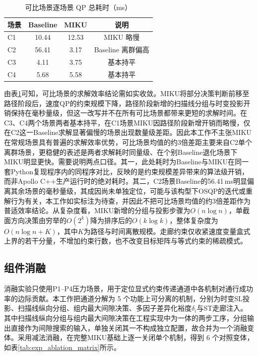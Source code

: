 \documentclass[a4paper,11pt]{ctexart}
\theoremstyle{definition}
\begin{document}
\begin{table}[htbp]
\centering
\caption{可比场景逐场景 QP 总耗时（ms）}
\label{tab:exp_qp_percomp}
\small
\begin{tabular}{lccc}
\toprule
\textbf{场景} & \textbf{Baseline} & \textbf{MIKU} & \textbf{说明} \\
\midrule
C1 & 10.44 & 12.53 & MIKU 略慢 \\
C2 & 56.41 & 3.17 & Baseline 离群偏高 \\
C3 & 4.11 & 3.75 & 基本持平 \\
C4 & 5.68 & 5.58 & 基本持平 \\
\bottomrule
\end{tabular}
\end{table}

由表\ref{tab:exp_qp_percomp}可知，可比场景的求解效率结论需如实收敛。MIKU将部分决策判断前移至路径阶段后，速度QP的约束规模下降，路径阶段新增的扫描线分组与时变投影开销保持在毫秒量级，但这一改写并不在所有可比场景都带来更短的求解时间。在C3、C4两个场景两者基本持平，在C1场景MIKU因路径阶段新增开销而略慢，仅在C2这一Baseline求解显著偏慢的场景出现数量级差距。因此本工作不主张MIKU在常规场景具有普遍的求解效率优势，可比场景均值的约3倍差距主要来自C2单个离群场景，更稳健的表述是两者求解耗时同量级、在个别Baseline退化场景下MIKU明显更快。需要说明两点口径。其一，此处耗时为Baseline与MIKU在同一套Python复现程序内的同程序对比，反映的是约束规模差异带来的算法级开销，而非Apollo C++生产运行时的绝对耗时。其二，C2场景Baseline的56.41\,ms明显偏离其余场景的毫秒量级，其成因尚未单独定位，可能与该构型下OSQP的迭代或重解行为有关，本工作如实标注为待查，并因此不把可比场景均值的约3倍差距作为普适效率结论。从复杂度看，MIKU新增的分组与投影步骤为$O(n \log n)$，单截面方向决策由穷举的$O(2^k)$降为排序后的$O(k \log k)$，整体复杂度为$O(n \log n + K)$，其中$K$为路径与时间离散规模。走廊约束仅收紧速度变量盒式上界的若干分量，不增加约束行数，也不改变目标矩阵与等式约束的稀疏模式。

\subsection{组件消融}
\label{subsec:exp_ablation}

消融实验只使用P1--P4压力场景，用于定位显式约束传递通道中各机制对通行成功率的边际贡献。本工作把通道分解为 5 个功能上可分离的机制，分别为时变SL投影、扫描线纵向分组、组内最大间隙决策、多因子差异化裕度$\delta_i$与ST走廊注入。其中扫描线纵向分组与组内最大间隙决策在工程实现中为一体的两步工序，分组输出直接作为间隙搜索的输入，单独关闭其一不构成独立配置，故合并为一个消融变体。采用减法消融，在完整MIKU基础上逐一关闭单个机制，得到 6 个对照变体，如表\ref{tab:exp_ablation_matrix}所示。
\end{document}
